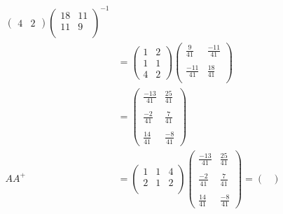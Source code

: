 \begin{example}
\begin{align*}
\begin{pmatrix}
            4 & 2
        \end{pmatrix}
        \begin{pmatrix}
            18 & 11 \\
            11 & 9  \\
        \end{pmatrix}^{-1}
        \\
               & =
        \begin{pmatrix}
            1 & 2 \\
            1 & 1 \\
            4 & 2
        \end{pmatrix}
        \begin{pmatrix}
            \displaystyle \frac{9}{41}   & \displaystyle  \frac{-11}{41} \\\\
            \displaystyle \frac{-11}{41} & \displaystyle   \frac{18}{41} \\
        \end{pmatrix}
        \\
               & =
        \begin{pmatrix}
            \displaystyle \frac{-13}{41} & \displaystyle \frac{25}{41} \\\\
            \displaystyle \frac{-2}{41}  & \displaystyle \frac{7}{41}  \\\\
            \displaystyle \frac{14}{41}  & \displaystyle \frac{-8}{41}
        \end{pmatrix}
        \\
        AA^{+} & = \begin{pmatrix}
                       1 & 1 & 4 \\
                       2 & 1 & 2 \\
                   \end{pmatrix} \begin{pmatrix}
                                     \displaystyle \frac{-13}{41} & \displaystyle \frac{25}{41} \\\\
                                     \displaystyle \frac{-2}{41}  & \displaystyle \frac{7}{41}  \\\\
                                     \displaystyle \frac{14}{41}  & \displaystyle \frac{-8}{41}
                                 \end{pmatrix} = \begin{pmatrix}

\end{pmatrix}
\end{align*}
\end{example}
